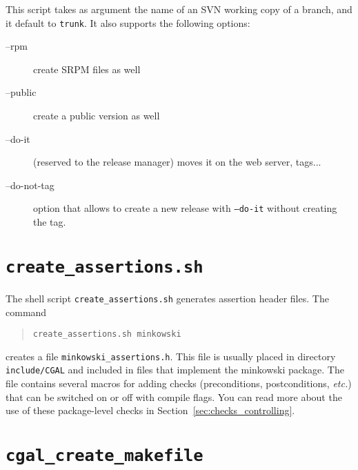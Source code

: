 This script takes as argument the name of an SVN working copy of a branch,
and it default to {\tt trunk}.  It also supports the following options:
\begin{description}
\item[--rpm]      create SRPM files as well
\item[--public]   create a public version as well
\item[--do-it]    (reserved to the release manager) moves it on the web server,
                  tags...
\item[--do-not-tag] option that allows to create a new release with
  \texttt{--do-it} without creating the tag.
\end{description}


\section{{\tt create\_assertions.sh}}
\label{sec:create_assertions}

The shell script
{{\tt create\_assertions.sh}} generates assertion header files.
The command
\begin{verse}
{\tt create\_assertions.sh minkowski}
\end{verse}
creates a file {\tt minkowski\_assertions.h}.
This file is usually placed in directory {\tt include/CGAL} and included in
files that implement the minkowski package.
The file contains several macros for adding checks (preconditions,
postconditions, {\em etc.}) that can be switched on or off with compile
flags.
You can read more about the use of these package-level checks in
Section~\ref{sec:checks_controlling}.


\section{{\tt cgal\_create\_makefile}}
\label{sec:cgal_create_makefile}

